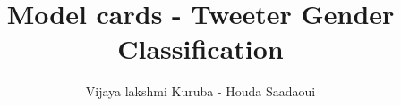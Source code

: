 \documentclass{article}
\title{Model cards - Tweeter Gender Classification}
\author{Vijaya lakshmi Kuruba - Houda Saadaoui}
\begin{document}
 
 \maketitle
 
 \newenvironment{mcsection}[1]
     {%
         \textbf{#1}
 
         \begin{itemize}[leftmargin=*,topsep=0pt,itemsep=-1ex,partopsep=1ex,parsep=1ex,after=\vspace{\medskipamount}]
     }
     {%
         \end{itemize}
     }
 
\end{document}
